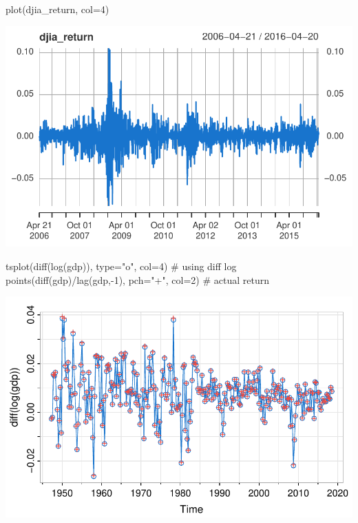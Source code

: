 \documentclass[
  letterpaper,
  DIV=11,
  numbers=noendperiod]{scrreprt}
\newenvironment{Shaded}{\begin{snugshade}}{\end{snugshade}}
\newcommand{\AttributeTok}[1]{\textcolor[rgb]{0.40,0.45,0.13}{#1}}
\newcommand{\CommentTok}[1]{\textcolor[rgb]{0.37,0.37,0.37}{#1}}
\newcommand{\DecValTok}[1]{\textcolor[rgb]{0.68,0.00,0.00}{#1}}
\newcommand{\FunctionTok}[1]{\textcolor[rgb]{0.28,0.35,0.67}{#1}}
\newcommand{\NormalTok}[1]{\textcolor[rgb]{0.00,0.23,0.31}{#1}}
\newcommand{\SpecialCharTok}[1]{\textcolor[rgb]{0.37,0.37,0.37}{#1}}
\newcommand{\StringTok}[1]{\textcolor[rgb]{0.13,0.47,0.30}{#1}}
\begin{document}
\begin{Shaded}
\begin{Highlighting}[]
\FunctionTok{plot}\NormalTok{(djia\_return, }\AttributeTok{col=}\DecValTok{4}\NormalTok{)}
\end{Highlighting}
\end{Shaded}

\includegraphics{LectureNotes/Lecture1_files/figure-pdf/ex-1-3-2.pdf}

\begin{Shaded}
\begin{Highlighting}[]
\FunctionTok{tsplot}\NormalTok{(}\FunctionTok{diff}\NormalTok{(}\FunctionTok{log}\NormalTok{(gdp)), }\AttributeTok{type=}\StringTok{"o"}\NormalTok{, }\AttributeTok{col=}\DecValTok{4}\NormalTok{)       }\CommentTok{\# using diff log}
\FunctionTok{points}\NormalTok{(}\FunctionTok{diff}\NormalTok{(gdp)}\SpecialCharTok{/}\FunctionTok{lag}\NormalTok{(gdp,}\SpecialCharTok{{-}}\DecValTok{1}\NormalTok{), }\AttributeTok{pch=}\StringTok{"+"}\NormalTok{, }\AttributeTok{col=}\DecValTok{2}\NormalTok{) }\CommentTok{\# actual return}
\end{Highlighting}
\end{Shaded}

\includegraphics{LectureNotes/Lecture1_files/figure-pdf/ex-1-3-3.pdf}
\end{document}

